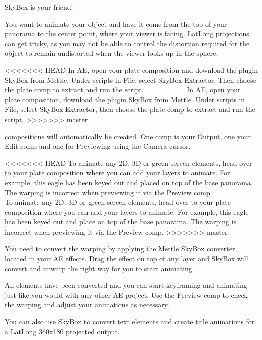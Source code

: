\begin{fullwidth}
\clearpage
{\large SkyBox is your friend! \par}

You want to animate your object and have it come from the top of your panorama to the center point, where your viewer is facing. LatLong projections can get tricky, as you may not be able to control the distortion required for the object to remain undistorted when the viewer looks up in the sphere.

<<<<<<< HEAD
In AE, open your plate composition and download the plugin SkyBox from Mettle. Under scripts in File, select SkyBox Extractor. Then choose the plate comp to extract and run the script.
=======
In AE, open your plate composition, download the plugin SkyBox from Mettle. Under scripts in File, select SkyBox Extractor, then choose the plate comp to extract and run the script.
>>>>>>> master

 compositions will automatically be created. One comp is your Output, one your Edit comp and one for Previewing using the Camera cursor.


<<<<<<< HEAD
To animate any 2D, 3D or green screen elements, head over to your plate composition where you can add your layers to animate. For example, this eagle has been keyed out and placed on top of the base panorama. The warping is incorrect when previewing it via the Preview comp. 
=======
To animate any 2D, 3D or green screen elements, head over to your plate composition where you can add your layers to animate. For example, this eagle has been keyed out and place on top of the base panorama. The warping is incorrect when previewing it via the Preview comp. 
>>>>>>> master


You need to convert the warping by applying the Mettle SkyBox converter, located in your AE effects. Drag the effect on top of any layer and SkyBox will convert and unwarp the right way for you to start animating. 


All elements have been converted and you can start keyframing and animating just like you would with any other AE project. Use the Preview comp to check the warping and adjust your animations as necessary. 


You can also use SkyBox to convert text elements and create title animations for a LatLong 360x180 projected output.


\clearpage
\end{fullwidth}